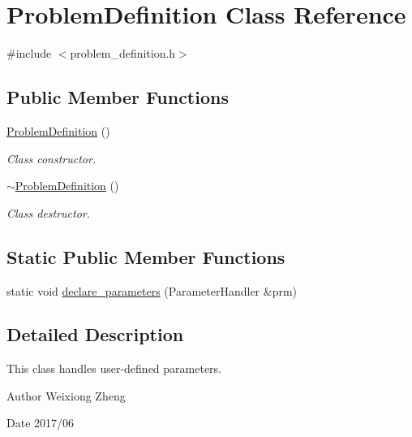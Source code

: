 \hypertarget{class_problem_definition}{}\section{Problem\+Definition Class Reference}
\label{class_problem_definition}


{\ttfamily \#include $<$problem\+\_\+definition.\+h$>$}

\subsection*{Public Member Functions}
\begin{DoxyCompactItemize}
\item 
\hyperlink{class_problem_definition_ad5d05724dd7de8e362f0c8db129744f9}{Problem\+Definition} ()
\begin{DoxyCompactList}\small\item\em Class constructor. \end{DoxyCompactList}\item 
\hyperlink{class_problem_definition_a6aa61be43188cf28040bd0e7d2bf02e3}{$\sim$\+Problem\+Definition} ()
\begin{DoxyCompactList}\small\item\em Class destructor. \end{DoxyCompactList}\end{DoxyCompactItemize}
\subsection*{Static Public Member Functions}
\begin{DoxyCompactItemize}
\item 
static void \hyperlink{class_problem_definition_a0a68b3c08b69729642dcfd37f23e7494}{declare\+\_\+parameters} (Parameter\+Handler \&prm)
\end{DoxyCompactItemize}


\subsection{Detailed Description}
This class handles user-\/defined parameters.

\begin{DoxyAuthor}{Author}
Weixiong Zheng 
\end{DoxyAuthor}
\begin{DoxyDate}{Date}
2017/06 
\end{DoxyDate}


